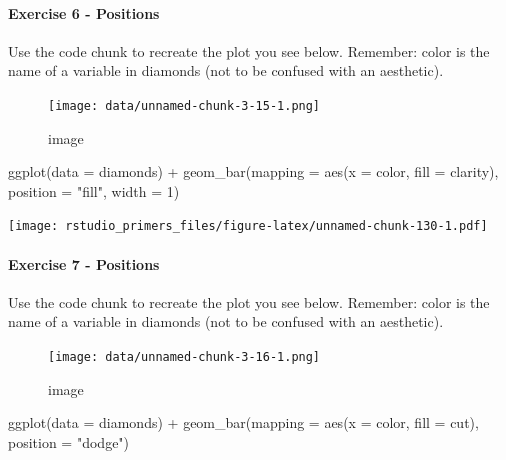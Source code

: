 \documentclass[
]{article}
\newenvironment{Shaded}{\begin{snugshade}}{\end{snugshade}}
\newcommand{\AttributeTok}[1]{\textcolor[rgb]{0.77,0.63,0.00}{#1}}
\newcommand{\DecValTok}[1]{\textcolor[rgb]{0.00,0.00,0.81}{#1}}
\newcommand{\FunctionTok}[1]{\textcolor[rgb]{0.00,0.00,0.00}{#1}}
\newcommand{\NormalTok}[1]{#1}
\newcommand{\SpecialCharTok}[1]{\textcolor[rgb]{0.00,0.00,0.00}{#1}}
\newcommand{\StringTok}[1]{\textcolor[rgb]{0.31,0.60,0.02}{#1}}
\begin{document}
\hypertarget{exercise-6---positions}{%
\paragraph{Exercise 6 - Positions}\label{exercise-6---positions}}

Use the code chunk to recreate the plot you see below. Remember: color
is the name of a variable in diamonds (not to be confused with an
aesthetic).

\begin{figure}
\centering
\texttt{[image: data/unnamed-chunk-3-15-1.png]}
\caption{image}
\end{figure}

\begin{Shaded}
\begin{Highlighting}[]
\FunctionTok{ggplot}\NormalTok{(}\AttributeTok{data =}\NormalTok{ diamonds) }\SpecialCharTok{+}
  \FunctionTok{geom\_bar}\NormalTok{(}\AttributeTok{mapping =} \FunctionTok{aes}\NormalTok{(}\AttributeTok{x =}\NormalTok{ color, }\AttributeTok{fill =}\NormalTok{ clarity), }\AttributeTok{position =} \StringTok{"fill"}\NormalTok{, }\AttributeTok{width =} \DecValTok{1}\NormalTok{)}
\end{Highlighting}
\end{Shaded}

\texttt{[image: rstudio\_primers\_files/figure-latex/unnamed-chunk-130-1.pdf]}

\hypertarget{exercise-7---positions}{%
\paragraph{Exercise 7 - Positions}\label{exercise-7---positions}}

Use the code chunk to recreate the plot you see below. Remember: color
is the name of a variable in diamonds (not to be confused with an
aesthetic).

\begin{figure}
\centering
\texttt{[image: data/unnamed-chunk-3-16-1.png]}
\caption{image}
\end{figure}

\begin{Shaded}
\begin{Highlighting}[]
\FunctionTok{ggplot}\NormalTok{(}\AttributeTok{data =}\NormalTok{ diamonds) }\SpecialCharTok{+}
  \FunctionTok{geom\_bar}\NormalTok{(}\AttributeTok{mapping =} \FunctionTok{aes}\NormalTok{(}\AttributeTok{x =}\NormalTok{ color, }\AttributeTok{fill =}\NormalTok{ cut), }\AttributeTok{position =} \StringTok{"dodge"}\NormalTok{)}
\end{Highlighting}
\end{Shaded}
\end{document}
